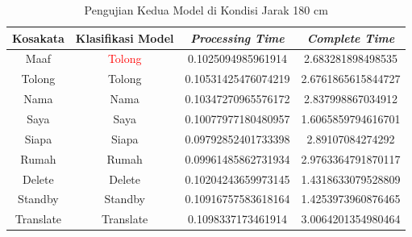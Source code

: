 \begin{longtable}{|c|c|c|c|}
  \caption{Pengujian Kedua Model di Kondisi Jarak 180 cm}
  \label{tb:prediksipendek2}                                   \\
  \hline
  \rowcolor[HTML]{C0C0C0}
  \textbf{Kosakata} & \textbf{Klasifikasi Model} & \textbf{\emph{Processing Time}} & \textbf{\emph{Complete Time}}\\
  \hline
  Maaf              & \textcolor{red}{Tolong}                        & 0.1025094985961914                           & 2.683281898498535                                  \\
  Tolong            & Tolong                        & 0.10531425476074219                           & 2.6761865615844727                                  \\
  Nama              & Nama                        & 0.10347270965576172                           & 2.837998867034912                                  \\
  Saya              & Saya                        & 0.10077977180480957                           & 1.6065859794616701                                  \\
  Siapa              & Siapa                        & 0.09792852401733398                           & 2.89107084274292                                  \\
  Rumah             & Rumah                        & 0.09961485862731934                           & 2.9763364791870117                                  \\
  Delete            & Delete                        & 0.10204243659973145                           & 1.4318633079528809                                  \\
  Standby           & Standby                        & 0.10916757583618164                           & 1.4253973960876465                                  \\
  Translate         & Translate                        & 0.1098337173461914                           & 3.0064201354980464                                  \\
  \hline
\end{longtable}

